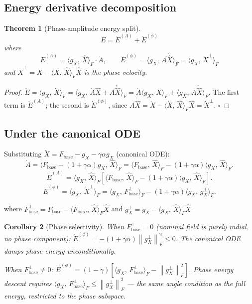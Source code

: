 \documentclass[11pt,a4paper]{article}
\newtheorem{theorem}{Theorem}[section]
\newtheorem{corollary}[theorem]{Corollary}
\theoremstyle{definition}
\newcommand{\norm}[1]{\left\|#1\right\|}
\newcommand{\inner}[2]{\langle #1,\,#2\rangle}
\newcommand{\Fbase}{F_{\mathrm{base}}}
\newcommand{\gX}{g_X}
\begin{document}
\subsection{Energy derivative decomposition}

\begin{theorem}[Phase-amplitude energy split]
\label{thm:phase-amp}
\[
\dot E = \dot E^{(A)} + \dot E^{(\phi)}
\]
where
\[
\dot E^{(A)} = \inner{\gX}{\hat X}_F \cdot \dot A, \qquad
\dot E^{(\phi)} = \inner{\gX}{A\dot{\hat X}}_F = \inner{\gX}{\dot X^\perp}_F
\]
and $\dot X^\perp = \dot X - \inner{\dot X}{\hat X}_F \hat X$ is the phase velocity.
\end{theorem}

\begin{proof}
$\dot E = \inner{\gX}{\dot X}_F = \inner{\gX}{\dot A\hat X + A\dot{\hat X}}_F
= \dot A\inner{\gX}{\hat X}_F + \inner{\gX}{A\dot{\hat X}}_F$.
The first term is $\dot E^{(A)}$; the second is $\dot E^{(\phi)}$, since
$A\dot{\hat X} = \dot X - \inner{\dot X}{\hat X}_F\hat X = \dot X^\perp$.
$\square$
\end{proof}

\subsection{Under the canonical ODE}

Substituting $\dot X = \Fbase - \gX - \gamma\alpha\gX$ (canonical ODE):
\[
\dot A = \inner{\Fbase - (1+\gamma\alpha)\gX}{\hat X}_F
= \inner{\Fbase}{\hat X}_F - (1+\gamma\alpha)\inner{\gX}{\hat X}_F.
\]
\[
\dot E^{(A)} = \inner{\gX}{\hat X}_F
\left[\inner{\Fbase}{\hat X}_F - (1+\gamma\alpha)\inner{\gX}{\hat X}_F\right].
\]
\[
\dot E^{(\phi)} = \inner{\gX}{\dot X^\perp}_F
= \inner{\gX}{\Fbase^\perp}_F - (1+\gamma\alpha)\inner{\gX}{\gX^\perp}_F.
\]

where $\Fbase^\perp = \Fbase - \inner{\Fbase}{\hat X}_F\hat X$ and
$\gX^\perp = \gX - \inner{\gX}{\hat X}_F\hat X$.

\begin{corollary}[Phase selectivity]
When $\Fbase^\perp = 0$ (nominal field is purely radial, no phase component):
$\dot E^{(\phi)} = -(1+\gamma\alpha)\norm{\gX^\perp}_F^2 \leq 0$.
The canonical ODE damps phase energy unconditionally.

When $\Fbase^\perp \neq 0$:
$\dot E^{(\phi)} = (1-\gamma)\left[\inner{\gX}{\Fbase^\perp}_F - \norm{\gX^\perp}_F^2\right]$.
Phase energy descent requires $\inner{\gX}{\Fbase^\perp}_F \leq \norm{\gX^\perp}_F^2$ —
the same angle condition as the full energy, restricted to the phase subspace.
\end{corollary}
\end{document}
